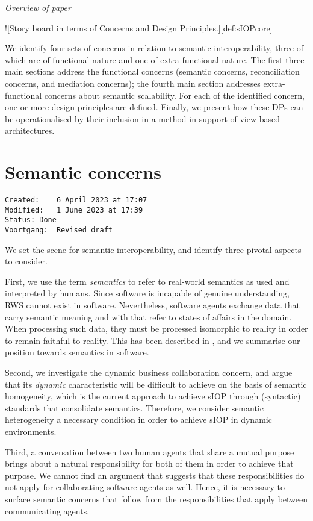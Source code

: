 \documentclass[sort&compress,preprint,3p,authoryear,twocolumn]{elsarticle}
\theoremstyle{break}			%
\begin{document}
\emph{Overview of paper}

!{[}Story board in terms of Concerns and Design
Principles.{]}{[}def:sIOPcore{]}

We identify four sets of concerns in relation to semantic
interoperability, three of which are of functional nature and one of
extra-functional nature. The first three main sections address the
functional concerns (semantic concerns, reconciliation concerns, and
mediation concerns); the fourth main section addresses extra-functional
concerns about semantic scalability. For each of the identified concern,
one or more design principles are defined. Finally, we present how these
DPs can be operationalised by their inclusion in a method in support of
view-based architectures.

\section{Semantic concerns}\label{semantic-concerns}

\begin{verbatim}
Created:    6 April 2023 at 17:07
Modified:   1 June 2023 at 17:39
Status: Done
Voortgang:  Revised draft
\end{verbatim}

We set the scene for semantic interoperability, and identify three
pivotal aspects to consider.

First, we use the term \emph{semantics} to refer to real-world semantics
as used and interpreted by humans. Since software is incapable of
genuine understanding, RWS cannot exist in software. Nevertheless,
software agents exchange data that carry semantic meaning and with that
refer to states of affairs in the domain. When processing such data,
they must be processed isomorphic to reality in order to remain faithful
to reality. This has been described in \citep{Brandt2021a}, and we
summarise our position towards semantics in software.

Second, we investigate the dynamic business collaboration concern, and
argue that its \emph{dynamic} characteristic will be difficult to
achieve on the basis of semantic homogeneity, which is the current
approach to achieve sIOP through (syntactic) standards that consolidate
semantics. Therefore, we consider semantic heterogeneity a necessary
condition in order to achieve sIOP in dynamic environments.

Third, a conversation between two human agents that share a mutual
purpose brings about a natural responsibility for both of them in order
to achieve that purpose. We cannot find an argument that suggests that
these responsibilities do not apply for collaborating software agents as
well. Hence, it is necessary to surface semantic concerns that follow
from the responsibilities that apply between communicating agents.
\end{document}
